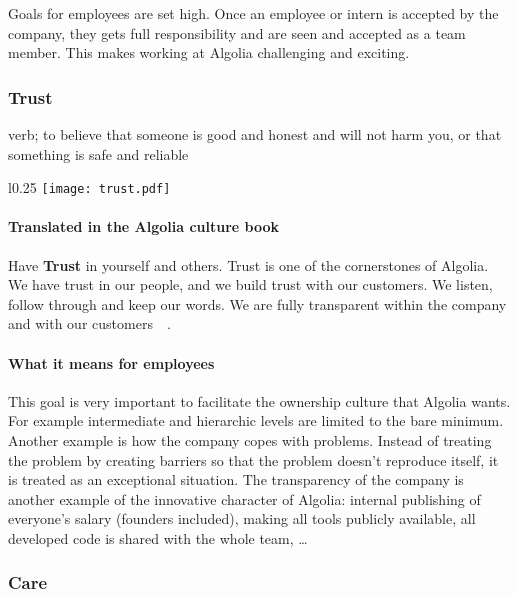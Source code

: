 Goals for employees are set high. Once an employee or intern is accepted by the company, they gets full responsibility and are seen and accepted as a team member. This makes working at Algolia challenging and exciting.

\subsubsection{Trust}
\label{ssub:trust}

\begin{definition}
verb; to believe that someone is good and honest and will not harm you, or that something is safe and reliable
\end{definition}

\begin{wrapfigure}{l}{0.25\textwidth}
  \centering
  \texttt{[image: trust.pdf]}
\end{wrapfigure}

\paragraph{Translated in the Algolia culture book}

Have \textbf{Trust} in yourself and others. Trust is one of the cornerstones of Algolia. We have trust in our people, and we build trust with our customers. We listen, follow through and keep our words. We are fully transparent within the company and with our customers~\cite{algolia-careers}~.

\paragraph{What it means for employees}

This goal is very important to facilitate the ownership culture that Algolia wants. For example intermediate and hierarchic levels are limited to the bare minimum. Another example is how the company copes with problems. Instead of treating the problem by creating barriers so that the problem doesn't reproduce itself, it is treated as an exceptional situation. The transparency of the company is another example of the innovative character of Algolia: internal publishing of everyone's salary (founders included), making all tools publicly available, all developed code is shared with the whole team, \dots

\subsubsection{Care}
\label{ssub:care}

